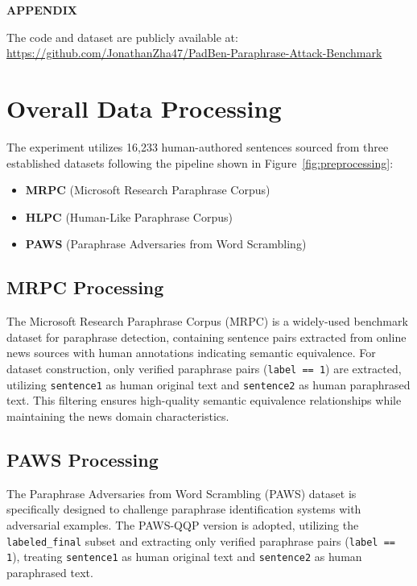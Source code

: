 \section*{} 
\begin{center}
    \Large\textbf{APPENDIX}
\end{center}

\noindent The code and dataset are publicly available at: 
\url{https://github.com/JonathanZha47/PadBen-Paraphrase-Attack-Benchmark}


\appendix

\section{Overall Data Processing}
\label{Appendix_A}

The experiment utilizes 16,233 human-authored sentences sourced from three established datasets following the pipeline shown in Figure~\ref{fig:preprocessing}:
\begin{itemize}
    \item \textbf{MRPC} (Microsoft Research Paraphrase Corpus) \cite{dolan2005automatically}
    \item \textbf{HLPC} (Human-Like Paraphrase Corpus)\cite{lau2024understandingeffectshumanwrittenparaphrases}
    \item \textbf{PAWS} (Paraphrase Adversaries from Word Scrambling)\cite{paws2019naacl}
\end{itemize}

\subsection{MRPC Processing}
The Microsoft Research Paraphrase Corpus (MRPC) \cite{dolan2005automatically} is a widely-used benchmark dataset for paraphrase detection, containing sentence pairs extracted from online news sources with human annotations indicating semantic equivalence. For dataset construction, only verified paraphrase pairs (\texttt{label == 1}) are extracted, utilizing \texttt{sentence1} as human original text and \texttt{sentence2} as human paraphrased text. This filtering ensures high-quality semantic equivalence relationships while maintaining the news domain characteristics.

\subsection{PAWS Processing}
The Paraphrase Adversaries from Word Scrambling (PAWS) dataset \cite{paws2019naacl} is specifically designed to challenge paraphrase identification systems with adversarial examples. The PAWS-QQP version is adopted, utilizing the \texttt{labeled\_final} subset and extracting only verified paraphrase pairs (\texttt{label == 1}), treating \texttt{sentence1} as human original text and \texttt{sentence2} as human paraphrased text.

